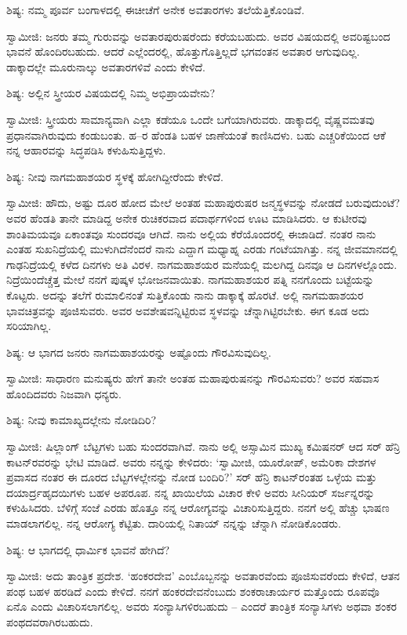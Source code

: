 ಶಿಷ್ಯ: ನಮ್ಮ ಪೂರ್ವ ಬಂಗಾಳದಲ್ಲಿ ಈಚೀಚೆಗೆ ಅನೇಕ ಅವತಾರಗಳು ತಲೆಯೆತ್ತಿಕೊಂಡಿವೆ.

ಸ್ವಾಮೀಜಿ: ಜನರು ತಮ್ಮ ಗುರುವನ್ನು ಅವತಾರಪುರುಷರೆಂದು ಕರೆಯಬಹುದು. ಅವರ ವಿಷಯದಲ್ಲಿ ಅವರಿಷ್ಟಬಂದ ಭಾವನೆ ಹೊಂದಿರಬಹುದು. ಆದರೆ ಎಲ್ಲೆಂದರಲ್ಲಿ, ಹೊತ್ತುಗೊತ್ತಿಲ್ಲದೆ ಭಗವಂತನ ಅವತಾರ ಆಗುವುದಿಲ್ಲ. ಡಾಕ್ಕಾದಲ್ಲೇ ಮೂರುನಾಲ್ಕು ಅವತಾರಗಳಿವೆ ಎಂದು ಕೇಳಿದೆ.

ಶಿಷ್ಯ: ಅಲ್ಲಿನ ಸ್ತ್ರೀಯರ ವಿಷಯದಲ್ಲಿ ನಿಮ್ಮ ಅಭಿಪ್ರಾಯವೇನು?

ಸ್ವಾಮೀಜಿ: ಸ್ತ್ರೀಯರು ಸಾಮಾನ್ಯವಾಗಿ ಎಲ್ಲಾ ಕಡೆಯೂ ಒಂದೇ ಬಗೆಯಾಗಿರುವರು. ಡಾಕ್ಕಾದಲ್ಲಿ ವೈಷ್ಣವಮತವು ಪ್ರಧಾನವಾಗಿರುವುದು ಕಂಡುಬಂತು. ಹ–ರ ಹೆಂಡತಿ ಬಹಳ ಜಾಣೆಯಂತೆ ಕಾಣಿಸಿದಳು. ಬಹು ಎಚ್ಚರಿಕೆಯಿಂದ ಆಕೆ ನನ್ನ ಆಹಾರವನ್ನು ಸಿದ್ಧಪಡಿಸಿ ಕಳುಹಿಸುತ್ತಿದ್ದಳು.

ಶಿಷ್ಯ: ನೀವು ನಾಗಮಹಾಶಯರ ಸ್ಥಳಕ್ಕೆ ಹೋಗಿದ್ದೀರೆಂದು ಕೇಳಿದೆ.

ಸ್ವಾಮೀಜಿ: ಹೌದು, ಅಷ್ಟು ದೂರ ಹೋದ ಮೇಲೆ ಅಂತಹ ಮಹಾಪುರುಷರ ಜನ್ಮಸ್ಥಳವನ್ನು ನೋಡದೆ ಬರುವುದುಂಟೆ? ಅವರ ಹೆಂಡತಿ ತಾನೇ ಮಾಡಿದ್ದ ಅನೇಕ ರುಚಿಕರವಾದ ಪದಾರ್ಥಗಳಿಂದ ಊಟ ಮಾಡಿಸಿದರು. ಆ ಕುಟೀರವು ಶಾಂತಿಮಯವೂ ಏಕಾಂತವೂ ಸುಂದರವೂ ಆಗಿದೆ. ನಾನು ಅಲ್ಲಿಯ ಕೆರೆಯೊಂದರಲ್ಲಿ ಈಜಾಡಿದೆ. ನಂತರ ನಾನು ಎಂತಹ ಸುಖನಿದ್ರೆಯಲ್ಲಿ ಮುಳುಗಿದೆನೆಂದರೆ ನಾನು ಎದ್ದಾಗ ಮಧ್ಯಾಹ್ನ ಎರಡು ಗಂಟೆಯಾಗಿತ್ತು. ನನ್ನ ಜೀವಮಾನದಲ್ಲಿ ಗಾಢನಿದ್ರೆಯಲ್ಲಿ ಕಳೆದ ದಿನಗಳು ಅತಿ ವಿರಳ. ನಾಗಮಹಾಶಯರ ಮನೆಯಲ್ಲಿ ಮಲಗಿದ್ದ ದಿನವೂ ಆ ದಿನಗಳಲ್ಲೊಂದು. ನಿದ್ರೆಯಿಂದೆಚ್ಚೆತ್ತ ಮೇಲೆ ನನಗೆ ಪುಷ್ಕಳ ಭೋಜನವಾಯಿತು. ನಾಗಮಹಾಶಯರ ಪತ್ನಿ ನನಗೊಂದು ಬಟ್ಟೆಯನ್ನು ಕೊಟ್ಟರು. ಅದನ್ನು ತಲೆಗೆ ರುಮಾಲಿನಂತೆ ಸುತ್ತಿಕೊಂಡು ನಾನು ಡಾಕ್ಕಾಕ್ಕೆ ಹೊರಟೆ. ಅಲ್ಲಿ ನಾಗಮಹಾಶಯರ ಭಾವಚಿತ್ರವನ್ನು ಪೂಜಿಸುವರು. ಅವರ ಅವಶೇಷವನ್ನಿಟ್ಟಿರುವ ಸ್ಥಳವನ್ನು ಚೆನ್ನಾಗಿಟ್ಟಿರಬೇಕು. ಈಗ ಕೂಡ ಅದು ಸರಿಯಾಗಿಲ್ಲ.

ಶಿಷ್ಯ: ಆ ಭಾಗದ ಜನರು ನಾಗಮಹಾಶಯರನ್ನು ಅಷ್ಟೊಂದು ಗೌರವಿಸುವುದಿಲ್ಲ.

ಸ್ವಾಮೀಜಿ: ಸಾಧಾರಣ ಮನುಷ್ಯರು ಹೇಗೆ ತಾನೇ ಅಂತಹ ಮಹಾಪುರುಷನನ್ನು ಗೌರವಿಸುವರು? ಅವರ ಸಹವಾಸ ಹೊಂದಿದವರು ನಿಜವಾಗಿ ಧನ್ಯರು.

ಶಿಷ್ಯ: ನೀವು ಕಾಮಾಖ್ಯದಲ್ಲೇನು ನೋಡಿದಿರಿ?

ಸ್ವಾಮೀಜಿ: ಷಿಲ್ಲಾಂಗ್ ಬೆಟ್ಟಗಳು ಬಹು ಸುಂದರವಾಗಿವೆ. ನಾನು ಅಲ್ಲಿ ಅಸ್ಸಾಮಿನ ಮುಖ್ಯ ಕಮಿಷನರ್ ಆದ ಸರ್ ಹೆನ್ರಿ ಕಾಟನ್‌ರವರನ್ನು ಭೇಟಿ ಮಾಡಿದೆ. ಅವರು ನನ್ನನ್ನು ಕೇಳಿದರು: ‘ಸ್ವಾಮೀಜಿ, ಯೂರೋಪ್, ಅಮೆರಿಕಾ ದೇಶಗಳ ಪ್ರವಾಸದ ನಂತರ ಈ ದೂರದ ಬೆಟ್ಟಗಳಲ್ಲೇನನ್ನು ನೋಡ ಬಂದಿರಿ?’ ಸರ್ ಹೆನ್ರಿ ಕಾಟನ್‌ರಂತಹ ಒಳ್ಳೆಯ ಮತ್ತು ದಯಾರ್ದ್ರಹೃದಯಿಗಳು ಬಹಳ ಅಪರೂಪ. ನನ್ನ ಖಾಯಿಲೆಯ ವಿಚಾರ ಕೇಳಿ ಅವರು ಸೀನಿಯರ್ ಸರ್ಜನ್ನರನ್ನು ಕಳುಹಿಸಿದರು. ಬೆಳಿಗ್ಗೆ ಸಂಜೆ ಎರಡು ಹೊತ್ತೂ ನನ್ನ ಆರೋಗ್ಯವನ್ನು ವಿಚಾರಿಸುತ್ತಿದ್ದರು. ನನಗೆ ಅಲ್ಲಿ ಹೆಚ್ಚು ಭಾಷಣ ಮಾಡಲಾಗಲಿಲ್ಲ. ನನ್ನ ಆರೋಗ್ಯ ಕೆಟ್ಟಿತು. ದಾರಿಯಲ್ಲಿ ನಿತಾಯ್ ನನ್ನನ್ನು ಚೆನ್ನಾಗಿ ನೋಡಿಕೊಂಡರು.

ಶಿಷ್ಯ: ಆ ಭಾಗದಲ್ಲಿ ಧಾರ್ಮಿಕ ಭಾವನೆ ಹೇಗಿದೆ?

ಸ್ವಾಮೀಜಿ: ಅದು ತಾಂತ್ರಿಕ ಪ್ರದೇಶ. ‘ಹಂಕರದೇವ’ ಎಂಬೊಬ್ಬನನ್ನು ಅವತಾರವೆಂದು ಪೂಜಿಸುವರೆಂದು ಕೇಳಿದೆ, ಆತನ ಪಂಥ ಬಹಳ ಹರಡಿದೆ ಎಂದು ಕೇಳಿದೆ. ನನಗೆ ಹಂಕರದೇವನೆಂಬುದು ಶಂಕರಾಚಾರ್ಯರ ಮತ್ತೊಂದು ರೂಪವೊ ಏನೊ ಎಂದು ವಿಚಾರಿಸಲಾಗಲಿಲ್ಲ. ಅವರು ಸಂನ್ಯಾಸಿಗಳಿರಬಹುದು – ಎಂದರೆ ತಾಂತ್ರಿಕ ಸಂನ್ಯಾಸಿಗಳು ಅಥವಾ ಶಂಕರ ಪಂಥದವರಾಗಿರಬಹುದು.

